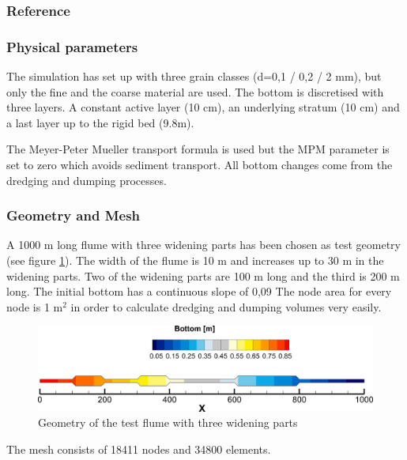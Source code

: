 %
%
\subsubsection{Reference}
%

%
%
\subsubsection{Physical parameters}
%
The simulation has set up with three grain classes (d=0,1 / 0,2 / 2 mm), but only the fine and the coarse material 
are used. The bottom is discretised with three layers. A constant active layer (10 cm), an underlying stratum (10 cm)
and a last layer up to the rigid bed (9.8m).  

The Meyer-Peter Mueller transport formula is used but the MPM parameter is set to zero which avoids sediment transport.
All bottom changes come from the dredging and dumping processes. 
%
%
\subsubsection{Geometry and Mesh}
%
A 1000 m long flume with three widening parts has been chosen as test geometry (see figure \ref{ini}).
The width of the flume is 10 m and increases up to 30 m in the widening parts. 
Two of the widening parts are 100 m long and the third is 200 m long. 
The initial bottom has a continuous slope of 0,09 %
The node area for every node is 1 m$^2$ in order to calculate dredging and dumping volumes very easily.

\begin{figure} [!h]
\centering
\includegraphics[scale=0.15]{../img/ini_bottom.png}
 \caption{Geometry of the test flume with three widening parts}\label{ini}
\end{figure}
The mesh consists of 18411 nodes and 34800 elements.


